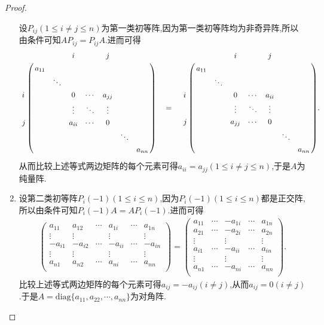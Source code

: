 \documentclass[lang=cn,newtx,10pt,scheme=chinese]{elegantbook}
\begin{document}
\begin{proof}
\begin{enumerate}
设\(P_{ij}(1\leq i\neq j\leq n)\)为第一类初等阵,因为第一类初等阵均为非奇异阵,所以由条件可知\(AP_{ij}=P_{ij}A\).进而可得
\begin{align*}
     \bordermatrix{%
    &    &		&		i&		&		j&		&		\cr
    &    a_{11}&		&		&		&		&		&		\cr
    &    &		\ddots&		&		&		&		&		\cr
    i&    &		&		0&		\cdots&		a_{jj}&		&		\cr
    &   &		&		\vdots&		\ddots&		\vdots&		&		\cr
    j&    &		&		a_{ii}&		\cdots&		0&		&		\cr
    &    &		&		&		&		&		\ddots&		\cr
    &    &		&		&		&		&		&		a_{nn}\cr
    } \quad =\quad \bordermatrix{%
    &    &		&		i&		&		j&		&		\cr
    &    a_{11}&		&		&		&		&		&		\cr
    &    &		\ddots&		&		&		&		&		\cr
    i&    &		&		0&		\cdots&		a_{ii}&		&		\cr
    &    &		&		\vdots&		\ddots&		\vdots&		&		\cr
    j&   &		&		a_{jj}&		\cdots&		0&		&		\cr
    &    &		&		&		&		&		\ddots&		\cr
    &    &		&		&		&		&		&		a_{nn}\cr
     } .
\end{align*}
从而比较上述等式两边矩阵的每个元素可得\(a_{ii}=a_{jj}(1\leq i\neq j\leq n)\),于是\(A\)为纯量阵.

\item 设第二类初等阵\(P_{i}(-1)(1\leq i\leq n)\),因为$P_{i}(-1)(1\leq i\leq n)$都是正交阵,所以由条件可知$P_{i}(-1)A=AP_{i}(-1)$.进而可得
    \begin{align*}
        \left( \begin{matrix}
            a_{11}&		a_{12}&		\cdots&		a_{1i}&		\cdots&		a_{1n}\\
            \vdots&		\vdots&		&		\vdots&		&		\vdots\\
            -a_{i1}&		-a_{i2}&		\cdots&		-a_{ii}&		\cdots&		-a_{in}\\
            \vdots&		\vdots&		&		\vdots&		&		\vdots\\
            a_{n1}&		a_{n2}&		\cdots&		a_{ni}&		\cdots&		a_{nn}\\
        \end{matrix} \right) =\left( \begin{matrix}
            a_{11}&		\cdots&		-a_{1i}&		\cdots&		a_{1n}\\
            a_{21}&		\cdots&		-a_{2i}&		\cdots&		a_{2n}\\
            \vdots&		&		\vdots&		&		\vdots\\
            a_{i1}&		\cdots&		-a_{ii}&		\cdots&		a_{in}\\
            \vdots&		&		\vdots&		&		\vdots\\
            a_{n1}&		\cdots&		-a_{ni}&		\cdots&		a_{nn}\\
        \end{matrix} \right) .
    \end{align*}
    比较上述等式两边矩阵的每个元素可得$a_{ij}=-a_{ij}\left( i\ne j \right) $,从而$a_{ij}=0\left( i\ne j \right) $.于是\(A=\text{diag}\{a_{11},a_{22},\cdots,a_{nn}\}\)为对角阵.


\end{enumerate}
\end{proof}
\end{document}
